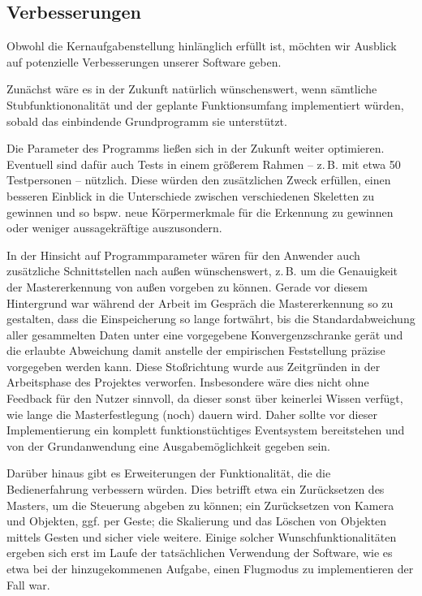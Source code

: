 \subsection{Verbesserungen}
Obwohl die Kernaufgabenstellung hinlänglich erfüllt ist, möchten wir Ausblick auf potenzielle Verbesserungen unserer Software geben.\par
Zunächst wäre es in der Zukunft natürlich wünschenswert, wenn sämtliche Stubfunktiononalität und der geplante Funktionsumfang implementiert würden, sobald das einbindende Grundprogramm sie unterstützt.\par 
Die Parameter des Programms ließen sich in der Zukunft weiter optimieren. Eventuell sind dafür auch Tests in einem größerem Rahmen -- z.\,B. mit etwa 50 Testpersonen -- nützlich. Diese würden den zusätzlichen Zweck erfüllen, einen besseren Einblick in die Unterschiede zwischen verschiedenen Skeletten zu gewinnen und so bspw. neue Körpermerkmale für die Erkennung zu gewinnen oder weniger aussagekräftige auszusondern.\par 
In der Hinsicht auf Programmparameter wären für den Anwender auch zusätzliche Schnittstellen nach außen wünschenswert, z.\,B. um die Genauigkeit der Mastererkennung von außen vorgeben zu können. Gerade vor diesem Hintergrund war während der Arbeit im Gespräch die Mastererkennung so zu gestalten, dass die Einspeicherung so lange fortwährt, bis die Standardabweichung aller gesammelten Daten unter eine vorgegebene Konvergenzschranke gerät und die erlaubte Abweichung damit anstelle der empirischen Feststellung präzise vorgegeben werden kann. Diese Stoßrichtung wurde aus Zeitgründen in der Arbeitsphase des Projektes verworfen. Insbesondere wäre dies nicht ohne Feedback für den Nutzer sinnvoll, da dieser sonst über keinerlei Wissen verfügt, wie lange die Masterfestlegung (noch) dauern wird. Daher sollte vor dieser Implementierung ein komplett funktionstüchtiges Eventsystem bereitstehen und von der Grundanwendung eine Ausgabemöglichkeit gegeben sein.\par 
Darüber hinaus gibt es Erweiterungen der Funktionalität, die die Bedienerfahrung verbessern würden. Dies betrifft etwa ein Zurücksetzen des Masters, um die Steuerung abgeben zu können; ein Zurücksetzen von Kamera und Objekten, ggf. per Geste; die Skalierung und das Löschen von Objekten mittels Gesten und sicher viele weitere. Einige solcher Wunschfunktionalitäten ergeben sich erst im Laufe der tatsächlichen Verwendung der Software, wie es etwa bei der hinzugekommenen Aufgabe, einen Flugmodus zu implementieren der Fall war.
%

